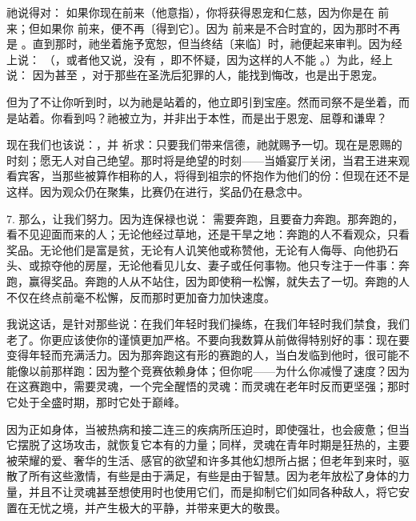  祂说得对： 如果你现在前来（他意指），你将获得恩宠和仁慈，因为你是在  前来；但如果你  前来，便不再〔得到它〕。因为  前来是不合时宜的，因为那时不再是 。直到那时，祂坐着施予宽恕，但当终结〔来临〕时，祂便起来审判。因为经上说： （，或者他又说，没有 ，即不怀疑，因为这样的人不能 。）为此，经上说：  因为甚至 ，对于那些在圣洗后犯罪的人，能找到悔改，也是出于恩宠。\par

但为了不让你听到时，以为祂是站着的，他立即引到宝座。然而司祭不是坐着，而是站着。你看到吗？祂被立为，并非出于本性，而是出于恩宠、屈尊和谦卑？\par

现在我们也该说：，并  祈求：只要我们带来信德，祂就赐予一切。现在是恩赐的时刻；愿无人对自己绝望。那时将是绝望的时刻——当婚宴厅关闭，当君王进来观看宾客，当那些被算作相称的人，将得到祖宗的怀抱作为他们的份：但现在还不是这样。因为观众仍在聚集，比赛仍在进行，奖品仍在悬念中。\par

7. 那么，让我们努力。因为连保禄也说：  需要奔跑，且要奋力奔跑。那奔跑的，看不见迎面而来的人；无论他经过草地，还是干旱之地：奔跑的人不看观众，只看奖品。无论他们是富是贫，无论有人讥笑他或称赞他，无论有人侮辱、向他扔石头、或掠夺他的房屋，无论他看见儿女、妻子或任何事物。他只专注于一件事：奔跑，赢得奖品。奔跑的人从不站住，因为即使稍一松懈，就失去了一切。奔跑的人不仅在终点前毫不松懈，反而那时更加奋力加快速度。\par

我说这话，是针对那些说：在我们年轻时我们操练，在我们年轻时我们禁食，我们老了。你更应该使你的谨慎更加严格。不要向我数算从前做得特别好的事：现在要变得年轻而充满活力。因为那奔跑这有形的赛跑的人，当白发临到他时，很可能不能像以前那样跑：因为整个竞赛依赖身体；但你呢——为什么你减慢了速度？因为在这赛跑中，需要灵魂，一个完全醒悟的灵魂：而灵魂在老年时反而更坚强；那时它处于全盛时期，那时它处于巅峰。\par

因为正如身体，当被热病和接二连三的疾病所压迫时，即使强壮，也会疲惫；但当它摆脱了这场攻击，就恢复它本有的力量；同样，灵魂在青年时期是狂热的，主要被荣耀的爱、奢华的生活、感官的欲望和许多其他幻想所占据；但老年到来时，驱散了所有这些激情，有些是由于满足，有些是由于智慧。因为老年放松了身体的力量，并且不让灵魂甚至想使用时也使用它们，而是抑制它们如同各种敌人，将它安置在无忧之境，并产生极大的平静，并带来更大的敬畏。\par

